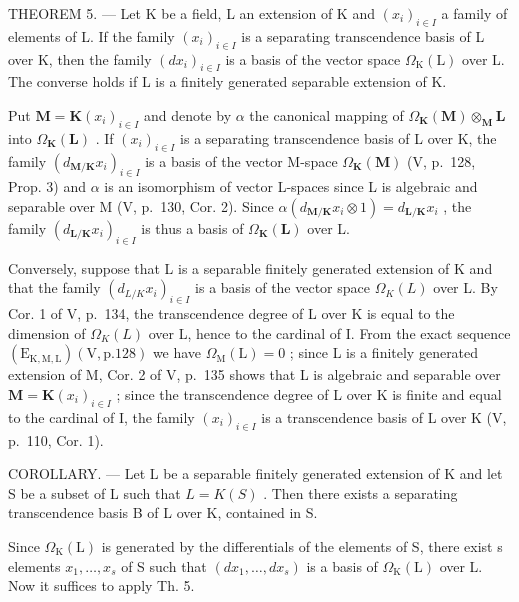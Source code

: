 THEOREM 5. --- Let K be a field, L an extension of K and \((x_{i})_{i\in I}\) a family of elements of L. If the family \((x_{i})_{i\in I}\) is a separating transcendence basis of L over K, then the family \((dx_{i})_{i\in I}\) is a basis of the vector space \(\Omega_{\mathrm{K}}(\mathrm{L})\) over L. The converse holds if L is a finitely generated separable extension of K.

Put \(\mathbf{M} = \mathbf{K}(x_i)_{i \in I}\) and denote by \(\alpha\) the canonical mapping of \(\Omega_{\mathbf{K}}(\mathbf{M}) \otimes_{\mathbf{M}} \mathbf{L}\) into \(\Omega_{\mathbf{K}}(\mathbf{L})\) . If \((x_i)_{i \in I}\) is a separating transcendence basis of L over K, the family \((d_{\mathbf{M}/\mathbf{K}} x_i)_{i \in I}\) is a basis of the vector M-space \(\Omega_{\mathbf{K}}(\mathbf{M})\) (V, p.~128, Prop. 3) and \(\alpha\) is an isomorphism of vector L-spaces since L is algebraic and separable over M (V, p.~130, Cor. 2). Since \(\alpha(d_{\mathbf{M}/\mathbf{K}} x_i \otimes 1) = d_{\mathbf{L}/\mathbf{K}} x_i\) , the family \((d_{\mathbf{L}/\mathbf{K}} x_i)_{i \in I}\) is thus a basis of \(\Omega_{\mathbf{K}}(\mathbf{L})\) over L.

Conversely, suppose that L is a separable finitely generated extension of K and that the family \((d_{L/K}x_{i})_{i\in I}\) is a basis of the vector space \(\Omega_{K}(L)\) over L. By Cor. 1 of V, p.~134, the transcendence degree of L over K is equal to the dimension of \(\Omega_{K}(L)\) over L, hence to the cardinal of I. From the exact sequence \((\mathrm{E}_{\mathrm{K},\mathrm{M},\mathrm{L}})(\mathrm{V},\mathrm{p}.128)\) we have \(\Omega_{\mathrm{M}}(\mathrm{L})=0\) ; since L is a finitely generated extension of M, Cor. 2 of V, p.~135 shows that L is algebraic and separable over \(\mathbf{M}=\mathbf{K}(x_{i})_{i\in I}\) ; since the transcendence degree of L over K is finite and equal to the cardinal of I, the family \((x_{i})_{i\in I}\) is a transcendence basis of L over K (V, p.~110, Cor. 1).

COROLLARY. --- Let L be a separable finitely generated extension of K and let S be a subset of L such that \(L = K(S)\) . Then there exists a separating transcendence basis B of L over K, contained in S.

Since \(\Omega_{\mathrm{K}}(\mathrm{L})\) is generated by the differentials of the elements of S, there exist s elements \(x_{1}, \ldots, x_{s}\) of S such that \((dx_{1}, \ldots, dx_{s})\) is a basis of \(\Omega_{\mathrm{K}}(\mathrm{L})\) over L. Now it suffices to apply Th. 5.

